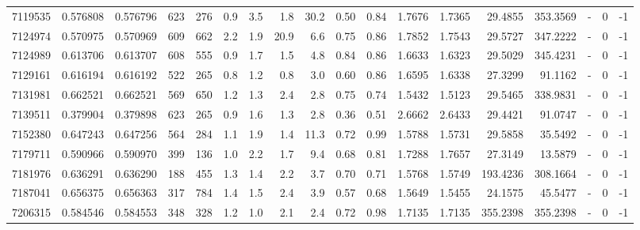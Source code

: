 \begin{tabular}{rrrrrrrrrrrrrrrlrr}
   7119535 & 0.576808 &   0.576796 &  623 &  276 &      0.9 &      3.5 &     1.8 &     30.2 &       0.50 &        0.84 &  1.7676 &  1.7365 &   29.4855 &  353.3569 &             - &        0 &         -1 \\
   7124974 & 0.570975 &   0.570969 &  609 &  662 &      2.2 &      1.9 &    20.9 &      6.6 &       0.75 &        0.86 &  1.7852 &  1.7543 &   29.5727 &  347.2222 &             - &        0 &         -1 \\
   7124989 & 0.613706 &   0.613707 &  608 &  555 &      0.9 &      1.7 &     1.5 &      4.8 &       0.84 &        0.86 &  1.6633 &  1.6323 &   29.5029 &  345.4231 &             - &        0 &         -1 \\
   7129161 & 0.616194 &   0.616192 &  522 &  265 &      0.8 &      1.2 &     0.8 &      3.0 &       0.60 &        0.86 &  1.6595 &  1.6338 &   27.3299 &   91.1162 &             - &        0 &         -1 \\
   7131981 & 0.662521 &   0.662521 &  569 &  650 &      1.2 &      1.3 &     2.4 &      2.8 &       0.75 &        0.74 &  1.5432 &  1.5123 &   29.5465 &  338.9831 &             - &        0 &         -1 \\
   7139511 & 0.379904 &   0.379898 &  623 &  265 &      0.9 &      1.6 &     1.3 &      2.8 &       0.36 &        0.51 &  2.6662 &  2.6433 &   29.4421 &   91.0747 &             - &        0 &         -1 \\
   7152380 & 0.647243 &   0.647256 &  564 &  284 &      1.1 &      1.9 &     1.4 &     11.3 &       0.72 &        0.99 &  1.5788 &  1.5731 &   29.5858 &   35.5492 &             - &        0 &         -1 \\
   7179711 & 0.590966 &   0.590970 &  399 &  136 &      1.0 &      2.2 &     1.7 &      9.4 &       0.68 &        0.81 &  1.7288 &  1.7657 &   27.3149 &   13.5879 &             - &        0 &         -1 \\
   7181976 & 0.636291 &   0.636290 &  188 &  455 &      1.3 &      1.4 &     2.2 &      3.7 &       0.70 &        0.71 &  1.5768 &  1.5749 &  193.4236 &  308.1664 &             - &        0 &         -1 \\
   7187041 & 0.656375 &   0.656363 &  317 &  784 &      1.4 &      1.5 &     2.4 &      3.9 &       0.57 &        0.68 &  1.5649 &  1.5455 &   24.1575 &   45.5477 &             - &        0 &         -1 \\
   7206315 & 0.584546 &   0.584553 &  348 &  328 &      1.2 &      1.0 &     2.1 &      2.4 &       0.72 &        0.98 &  1.7135 &  1.7135 &  355.2398 &  355.2398 &             - &        0 &         -1 \\

\end{tabular}
